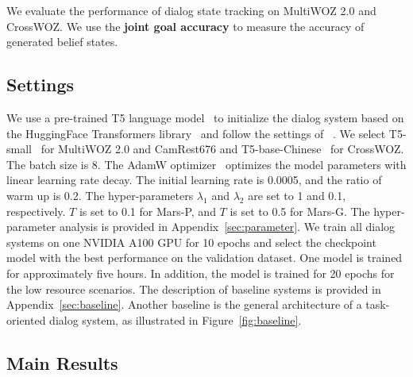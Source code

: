 We evaluate the performance of dialog state tracking on MultiWOZ 2.0 and CrossWOZ. We use the \textbf{joint goal accuracy} to measure the accuracy of generated belief states.

\subsection{Settings}
We use a pre-trained T5 language model~\cite{2020t5} to initialize the dialog system based on the HuggingFace Transformers library~\cite{wolf-etal-2020-transformers} and follow the settings of ~\citet{lee-2021-improving-end}. %
We select   T5-small~\cite{2020t5} for MultiWOZ 2.0 and CamRest676 and T5-base-Chinese~\cite{2020t5,zhao-etal-2019-uer} for CrossWOZ.
The batch size is  8. 
The AdamW optimizer~\cite{DBLP:conf/iclr/LoshchilovH19} optimizes  the model parameters with linear learning rate decay. The initial learning rate is 0.0005, and the ratio of warm up is 0.2.
The hyper-parameters $\lambda_{1}$ and $\lambda_{2}$ are set to 1 and 0.1, respectively. $T$ is set to 0.1 for Mars-P, and $T$ is set to 0.5 for Mars-G. The hyper-parameter  analysis is provided in Appendix~\ref{sec:parameter}.
We train all dialog systems on one NVIDIA A100 GPU  for 10 epochs and select the checkpoint model with the best performance on the validation dataset.  One model is trained for approximately five hours. In addition, the model is trained for 20 epochs for the  low resource scenarios.
  The description  of baseline systems is provided in Appendix~\ref{sec:baseline}. Another baseline is the general architecture of a task-oriented dialog system, as illustrated in Figure~\ref{fig:baseline}.

\subsection{Main Results}

